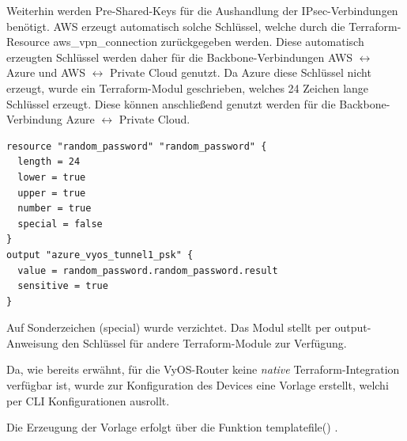 Weiterhin werden Pre-Shared-Keys für die Aushandlung der IPsec-Verbindungen benötigt. AWS erzeugt automatisch solche Schlüssel, welche durch die Terraform-Resource \glqq aws\_vpn\_connection\grqq{} zurückgegeben werden. Diese automatisch erzeugten Schlüssel werden daher für die Backbone-Verbindungen AWS $\leftrightarrow$ Azure und AWS $\leftrightarrow$ Private Cloud genutzt. Da Azure diese Schlüssel nicht erzeugt, wurde ein Terraform-Modul geschrieben, welches 24 Zeichen lange Schlüssel erzeugt. Diese können anschließend genutzt werden für die Backbone-Verbindung Azure $\leftrightarrow$ Private Cloud.
\begin{listing}[h]
\begin{verbatim}
resource "random_password" "random_password" {
  length = 24
  lower = true
  upper = true
  number = true
  special = false
}
output "azure_vyos_tunnel1_psk" {
  value = random_password.random_password.result
  sensitive = true
}
\end{verbatim}
\caption{Auf Sonderzeichen (special) wurde verzichtet. Das Modul stellt per output-Anweisung den Schlüssel für andere Terraform-Module zur Verfügung.}
\label{tf-generate-psk}
\end{listing}\FloatBarrier
Da, wie bereits erwähnt, für die VyOS-Router keine \textit{native} Terraform-Integration verfügbar ist, wurde zur Konfiguration des Devices eine Vorlage erstellt, welchi per CLI Konfigurationen ausrollt.

Die Erzeugung der Vorlage erfolgt über die Funktion templatefile() \cite{templatefiletf2021}.

